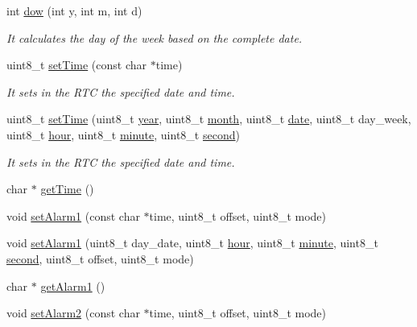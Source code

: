 \begin{DoxyCompactItemize}
int \hyperlink{class_wasp_r_t_c_ae46667354809aece99983084773cf976}{dow} (int y, int m, int d)
\begin{DoxyCompactList}\small\item\em It calculates the day of the week based on the complete date. \end{DoxyCompactList}\item 
uint8\+\_\+t \hyperlink{class_wasp_r_t_c_afceabc433a5dc8d002c709f5703352a9}{set\+Time} (const char $\ast$time)
\begin{DoxyCompactList}\small\item\em It sets in the R\+TC the specified date and time. \end{DoxyCompactList}\item 
uint8\+\_\+t \hyperlink{class_wasp_r_t_c_ac4a457e1fe7dbf6c2c71a338a4d774f6}{set\+Time} (uint8\+\_\+t \hyperlink{class_wasp_r_t_c_ad646e9d4a4255e945ca438ccc8f85f3e}{year}, uint8\+\_\+t \hyperlink{class_wasp_r_t_c_ac9753d846137f17f54c9af1dc1dc9902}{month}, uint8\+\_\+t \hyperlink{class_wasp_r_t_c_afc2f32d6e3915726394eb5f0a52920fc}{date}, uint8\+\_\+t day\+\_\+week, uint8\+\_\+t \hyperlink{class_wasp_r_t_c_a0b743dddae720f33e107233086e08e62}{hour}, uint8\+\_\+t \hyperlink{class_wasp_r_t_c_adc5a10810d87d464a49b998936b48839}{minute}, uint8\+\_\+t \hyperlink{class_wasp_r_t_c_ada5488e4d4353b46588db98b7531afe4}{second})
\begin{DoxyCompactList}\small\item\em It sets in the R\+TC the specified date and time. \end{DoxyCompactList}\item 
char $\ast$ \hyperlink{class_wasp_r_t_c_adeaf194910cea5ebbe6c4adebbcd989c}{get\+Time} ()
\item 
void \hyperlink{class_wasp_r_t_c_a490dd61c617b8d146667aa307961132e}{set\+Alarm1} (const char $\ast$time, uint8\+\_\+t offset, uint8\+\_\+t mode)
\item 
void \hyperlink{class_wasp_r_t_c_a6a428ba63570fb35ac8d2b18c83e7425}{set\+Alarm1} (uint8\+\_\+t day\+\_\+date, uint8\+\_\+t \hyperlink{class_wasp_r_t_c_a0b743dddae720f33e107233086e08e62}{hour}, uint8\+\_\+t \hyperlink{class_wasp_r_t_c_adc5a10810d87d464a49b998936b48839}{minute}, uint8\+\_\+t \hyperlink{class_wasp_r_t_c_ada5488e4d4353b46588db98b7531afe4}{second}, uint8\+\_\+t offset, uint8\+\_\+t mode)
\item 
char $\ast$ \hyperlink{class_wasp_r_t_c_ad6e99510cb41a42bf0c31e9a5709ad2f}{get\+Alarm1} ()
\item 
void \hyperlink{class_wasp_r_t_c_a398ed640e1db583308f3eaf1ca03bc6e}{set\+Alarm2} (const char $\ast$time, uint8\+\_\+t offset, uint8\+\_\+t mode)

\end{DoxyCompactItemize}
